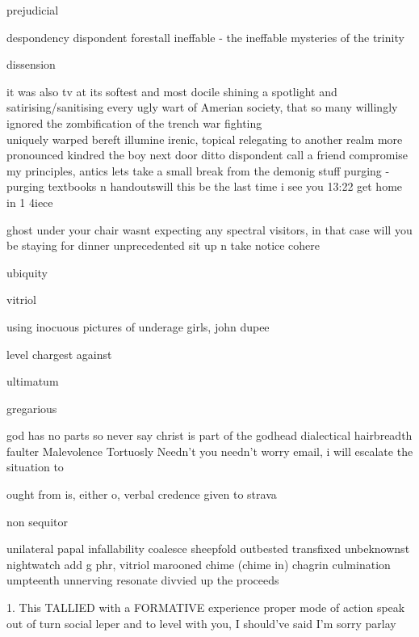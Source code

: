 
prejudicial

despondency
dispondent
forestall
ineffable - the ineffable mysteries of the trinity

dissension

it was also tv at its softest and most docile
shining a spotlight and satirising/sanitising every ugly wart of Amerian society, that so many willingly ignored
the zombification of the
trench war fighting\\
uniquely warped
bereft illumine irenic, topical relegating to another realm
more pronounced
kindred
the boy next door
ditto
dispondent
call a friend
compromise my principles, antics
lets take a small break from the demonig stuff
purging - purging textbooks n handoutswill this be the last time i see you
13:22
get home in 1 4iece


ghost under your chair
wasnt expecting any spectral visitors, in that case will you be staying for dinner
unprecedented
sit up n take notice
cohere



ubiquity

vitriol

using inocuous pictures of underage girls, john dupee

level chargest against

ultimatum


gregarious

god has no parts so never say christ is part of the godhead
dialectical
hairbreadth
faulter
Malevolence
Tortuosly
Needn't you needn't worry
email, i will escalate the situation to

ought from is, either o, verbal credence given to
strava

non sequitor

unilateral papal infallability
coalesce
sheepfold
outbested
transfixed
unbeknownst
nightwatch
add g phr,
vitriol
marooned
chime (chime in)
chagrin
culmination
umpteenth
unnerving
resonate
divvied up the proceeds

1. This TALLIED with a FORMATIVE experience
proper mode of action
speak out of turn
social leper
and to level with you, I should've said I'm sorry
parlay

